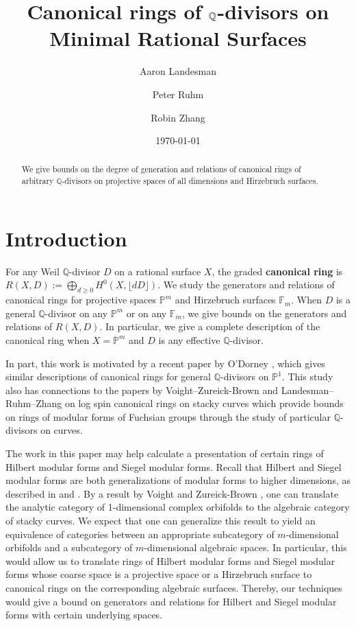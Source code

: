 \documentclass{amsart}
\title{Canonical rings of $\bq$-divisors on Minimal Rational Surfaces}
\author{Aaron Landesman}
\author{Peter Ruhm}
\author{Robin Zhang}
\date{\today}
\theoremstyle{plain}
\theoremstyle{definition}
\theoremstyle{remark}
\numberwithin{equation}{section}
\newcommand\bq{{\mathbb Q}}
\newcommand\bp{{\mathbb P}}
\newcommand\hirz{\mathbb{F}}
\begin{document}
\begin{abstract}
 	We give bounds on the degree of generation and relations of
	canonical rings of arbitrary $\bq$-divisors
	on projective spaces of all dimensions
	and Hirzebruch surfaces.
\end{abstract}

\maketitle
{}


\section{Introduction}
\label{sec:intro}
For any Weil $\bq$-divisor $D$ on a rational surface $X$, the graded
\textbf{canonical ring} is $R(X, D) := \bigoplus_{d \geq 0} H^0(X, \lfloor dD \rfloor)$.
We study the generators and relations of canonical
rings for projective spaces $\bp^m$ and Hirzebruch surfaces $\hirz_m$.
When $D$ is a general $\bq$-divisor on any $\bp^m$ or on any
$\hirz_m$, we give bounds on the generators and relations of
$R(X, D)$. In particular, we give a complete description of the
canonical ring when $X = \bp^m$ and $D$ is any effective
$\bq$-divisor.

In part, this work is motivated by a recent paper by
O'Dorney \cite{dorney:canonical}, which gives similar descriptions
of canonical rings for general $\bq$-divisors on $\bp^1$. This
study also has connections to the papers by Voight--Zureick-Brown 
\cite{vzb:stacky} and Landesman--Ruhm--Zhang \cite{lrz:spin-cring}
on log spin canonical rings on stacky curves which provide bounds
on rings of modular forms of Fuchsian groups through the study
of particular $\bq$-divisors on curves.

The work in this paper may help calculate a presentation of certain rings of
Hilbert 
modular forms and Siegel modular forms. Recall that Hilbert and Siegel 
modular forms are both generalizations of modular forms to higher dimensions,
as described in \cite{geer:siegel-modular} and \cite{bruinier:hilbert-modular}.
By a result by Voight and Zureick-Brown \cite[Proposition 6.1.5]{vzb:stacky}, 
one can translate the analytic category of 1-dimensional complex orbifolds to
the algebraic category of stacky curves. 
We expect that one can generalize this result to yield an equivalence of
categories between an appropriate subcategory of $m$-dimensional orbifolds and
a subcategory of $m$-dimensional algebraic spaces.
In particular, this would allow us to translate rings of Hilbert modular forms
and Siegel modular forms whose coarse space is a projective space or a
Hirzebruch surface to canonical rings on the corresponding algebraic surfaces.
Thereby, our techniques would give a bound on generators and relations for
Hilbert and Siegel modular forms with certain underlying spaces.
\end{document}
